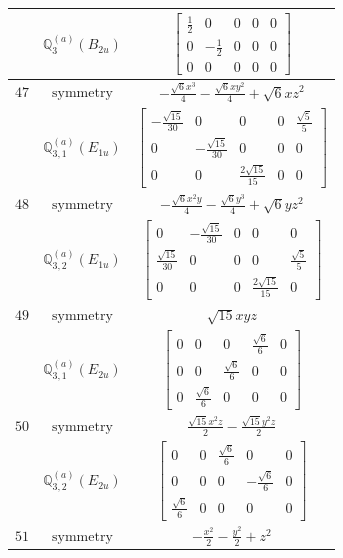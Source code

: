 \documentclass[fleqn,8pt,landscape]{jsarticle}
\begin{document}
\begin{longtable}{ccc}
$  $ & $ \mathbb{Q}_{3}^{(a)}(B_{2u}) $ & $ \begin{bmatrix} \frac{1}{2} & 0 & 0 & 0 & 0 \\ 0 & - \frac{1}{2} & 0 & 0 & 0 \\ 0 & 0 & 0 & 0 & 0 \end{bmatrix} $ \\ \hline
$ 47 $ & $ \text{symmetry} $ & $ - \frac{\sqrt{6} x^{3}}{4} - \frac{\sqrt{6} x y^{2}}{4} + \sqrt{6} x z^{2} $ \\
$  $ & $ \mathbb{Q}_{3,1}^{(a)}(E_{1u}) $ & $ \begin{bmatrix} - \frac{\sqrt{15}}{30} & 0 & 0 & 0 & \frac{\sqrt{5}}{5} \\ 0 & - \frac{\sqrt{15}}{30} & 0 & 0 & 0 \\ 0 & 0 & \frac{2 \sqrt{15}}{15} & 0 & 0 \end{bmatrix} $ \\ \hline
$ 48 $ & $ \text{symmetry} $ & $ - \frac{\sqrt{6} x^{2} y}{4} - \frac{\sqrt{6} y^{3}}{4} + \sqrt{6} y z^{2} $ \\
$  $ & $ \mathbb{Q}_{3,2}^{(a)}(E_{1u}) $ & $ \begin{bmatrix} 0 & - \frac{\sqrt{15}}{30} & 0 & 0 & 0 \\ \frac{\sqrt{15}}{30} & 0 & 0 & 0 & \frac{\sqrt{5}}{5} \\ 0 & 0 & 0 & \frac{2 \sqrt{15}}{15} & 0 \end{bmatrix} $ \\ \hline
$ 49 $ & $ \text{symmetry} $ & $ \sqrt{15} x y z $ \\
$  $ & $ \mathbb{Q}_{3,1}^{(a)}(E_{2u}) $ & $ \begin{bmatrix} 0 & 0 & 0 & \frac{\sqrt{6}}{6} & 0 \\ 0 & 0 & \frac{\sqrt{6}}{6} & 0 & 0 \\ 0 & \frac{\sqrt{6}}{6} & 0 & 0 & 0 \end{bmatrix} $ \\ \hline
$ 50 $ & $ \text{symmetry} $ & $ \frac{\sqrt{15} x^{2} z}{2} - \frac{\sqrt{15} y^{2} z}{2} $ \\
$  $ & $ \mathbb{Q}_{3,2}^{(a)}(E_{2u}) $ & $ \begin{bmatrix} 0 & 0 & \frac{\sqrt{6}}{6} & 0 & 0 \\ 0 & 0 & 0 & - \frac{\sqrt{6}}{6} & 0 \\ \frac{\sqrt{6}}{6} & 0 & 0 & 0 & 0 \end{bmatrix} $ \\ \hline
$ 51 $ & $ \text{symmetry} $ & $ - \frac{x^{2}}{2} - \frac{y^{2}}{2} + z^{2} $ \\

\end{longtable}
\end{document}

